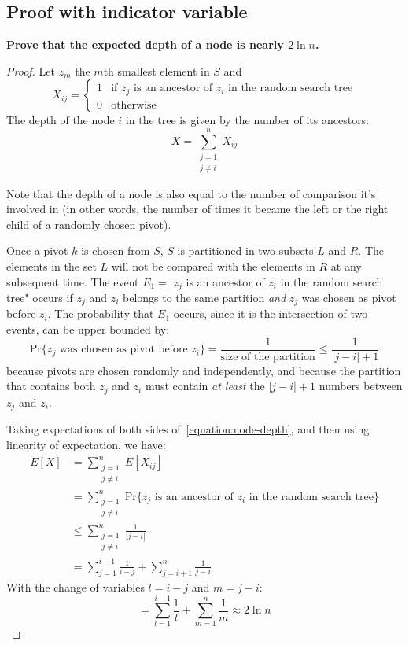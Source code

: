 \documentclass{article}
\begin{document}
\subsection{Proof with indicator variable}

\textbf{Prove that the expected depth of a node is nearly $2 \ln n$.}

\begin{proof}
  Let $z_m$ the $m$th smallest element in $S$ and $$X_{ij}=
  \left\{
    \begin{array}{ll}
      1 & \mbox{if $z_j$ is an ancestor of $z_i$ in the random search tree} \\
      0 & \mbox{otherwise}
    \end{array}
  \right.$$
  The depth of the node $i$ in the tree is given by the number of its ancestors:
  \begin{equation}
    X=\sum_{\substack{j=1 \\ j\ne i}}^n X_{ij}
    \label{equation:node-depth}
  \end{equation}

  Note that the depth of a node is also equal to the number of comparison it's
  involved in (in other words, the number of times it became the left or the
  right child of a randomly chosen pivot).

  Once a pivot $k$ is chosen from $S$, $S$ is partitioned in two subsets $L$ and
  $R$. The elements in the set $L$ will not be compared with the elements in $R$
  at any subsequent time. The event $E_1=$ $z_j$ is an ancestor of $z_i$ in the
  random search tree" occurs if $z_j$ and $z_i$ belongs to the same partition
  \emph{and} $z_j$ was chosen as pivot before $z_i$. The probability that $E_1$
  occurs, since it is the intersection of two events, can be upper bounded by:
  $$\text{Pr}\{ z_j \text{ was chosen as pivot before } z_i
  \}=\frac{1}{\text{size of the partition}}\leq\frac{1}{|j-i|+1}$$ because
  pivots are chosen randomly and independently, and because the partition that
  contains both $z_j$ and $z_i$ must contain \emph{at least} the $|j-i|+1$
  numbers between $z_j$ and $z_i$.

  Taking expectations of both sides of~\eqref{equation:node-depth}, and then
  using linearity of expectation, we have:
  \begin{align*}
    E[X] & = \sum_{\substack{j=1\\ j\ne i}}^n E[X_{ij}] \\
    & = \sum_{\substack{j=1\\ j\ne i}}^n \text{Pr}\{ z_j \text{ is an ancestor
      of } z_i \text{ in the random search tree} \} \\
    & \le \sum_{\substack{j=1\\ j\ne i}}^n \frac{1}{|j-i|} \\
    & = \sum_{j=1}^{i-1} \frac{1}{i-j} + \sum_{j=i+1}^{n} \frac{1}{j-i}
  \end{align*}
  With the change of variables $l=i-j$ and $m=j-i$:
  \begin{equation*}
    = \sum_{l=1}^{i-1} \frac{1}{l} + \sum_{m=1}^{n} \frac{1}{m} \approx 2\ln n
  \end{equation*}

\end{proof}
\end{document}
